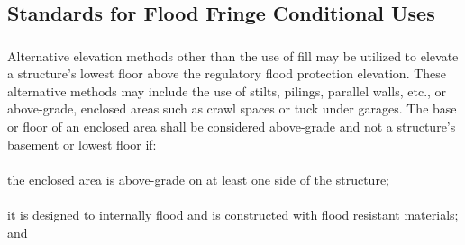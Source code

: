 \subsection{Standards for Flood Fringe Conditional Uses}
\subsubsection{}
Alternative elevation methods other than the use of fill may be utilized to elevate a structure's lowest floor above the regulatory flood protection elevation. These alternative methods may include the use of stilts, pilings, parallel walls, etc., or above-grade, enclosed areas such as crawl spaces or tuck under garages. The base or floor of an enclosed area shall be considered above-grade and not a structure's basement or lowest floor if:
\paragraph{}
the enclosed area is above-grade on at least one side of the structure;
\paragraph{}
it is designed to internally flood and is constructed with flood resistant materials; and
